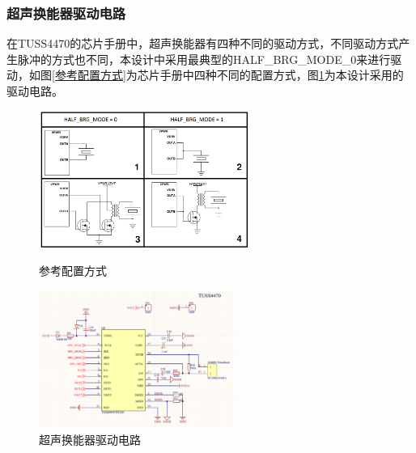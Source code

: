     \subsubsection{超声换能器驱动电路}
    在TUSS4470的芯片手册中，超声换能器有四种不同的驱动方式，不同驱动方式产生脉冲的方式也不同，本设计中采用最典型的HALF\_BRG\_MODE\_0来进行驱动，如图\ref{参考配置方式}为芯片手册中四种不同的配置方式，图\ref{超声换能器驱动电路}为本设计采用的驱动电路。
    \begin{figure}[H]
	\centering
	
	\begin{minipage}{0.4\linewidth}
		\centering
		\includegraphics[height=4.5cm]{figure/TUSS4470 Transducer Drive Options.png}
		\caption{参考配置方式}
		\label{参考配置方式}%
	\end{minipage}
	\begin{minipage}{0.5\linewidth}
		\centering
		\includegraphics[height=4.5cm]{figure/TUSS4470 peripheral circuit.png}
		\caption{超声换能器驱动电路}
		\label{超声换能器驱动电路}%
	\end{minipage}
\end{figure}

